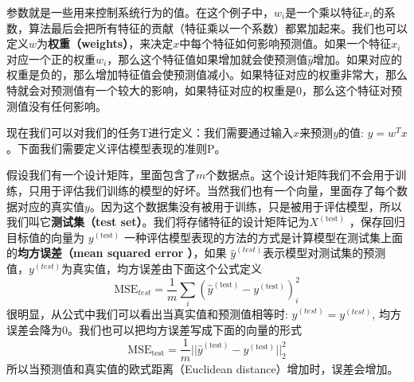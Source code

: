 参数就是一些用来控制系统行为的值。在这个例子中，$w_i$是一个乘以特征$x_i$的系数，算法最后会把所有特征的贡献（特征乘以一个系数）都累加起来。我们也可以定义$w$为\textbf{权重（weights）}，来决定$x$中每个特征如何影响预测值。如果一个特征$x_i$ 对应一个正的权重$w_i$，那么这个特征值如果增加就会使预测值$\hat{y}$增加。如果对应的权重是负的，那么增加特征值会使预测值减小。如果特征对应的权重非常大，那么特就会对预测值有一个较大的影响，如果特征对应的权重是$0$，那么这个特征对预测值没有任何影响。

现在我们可以对我们的任务T进行定义：我们需要通过输入$x$来预测$y$的值: $\hat{y}=w^{T}x$。下面我们需要定义评估模型表现的准则P。

假设我们有一个设计矩阵，里面包含了$m$个数据点。这个设计矩阵我们不会用于训练，只用于评估我们训练的模型的好坏。当然我们也有一个向量，里面存了每个数据对应的真实值$y$。因为这个数据集没有被用于训练，只是被用于评估模型，所以我们叫它\textbf{测试集（test set）}。我们将存储特征的设计矩阵记为$X^{(\mathrm{test})}$ ，保存回归目标值的向量为 $y^{(\mathrm{test})}$
一种评估模型表现的方法的方式是计算模型在测试集上面的\textbf{均方误差（mean squared error ）}，如果 $\hat{y}^{(test)}$表示模型对测试集的预测值，$y^{(test)}$为真实值，均方误差由下面这个公式定义
\begin{equation}
    \mathrm{MSE}_{test}=\frac{1}{m}\sum_{i}(\hat{y}^{(\mathrm{test})}-y^{(\mathrm{test})})_{i}^{2}
\end{equation}
很明显，从公式中我们可以看出当真实值和预测值相等时: $\hat{y}^{(test)}=y^{(test)}$, 均方误差会降为$0$。我们也可以把均方误差写成下面的向量的形式
\begin{equation}
   \mathrm{MSE}_{\mathrm{test}}=\frac{1}{m}||\hat{y}^{(\mathrm{test})}-y^{(\mathrm{test})}||_{2}^{2}
\end{equation}
所以当预测值和真实值的欧式距离（Euclidean distance）增加时，误差会增加。


